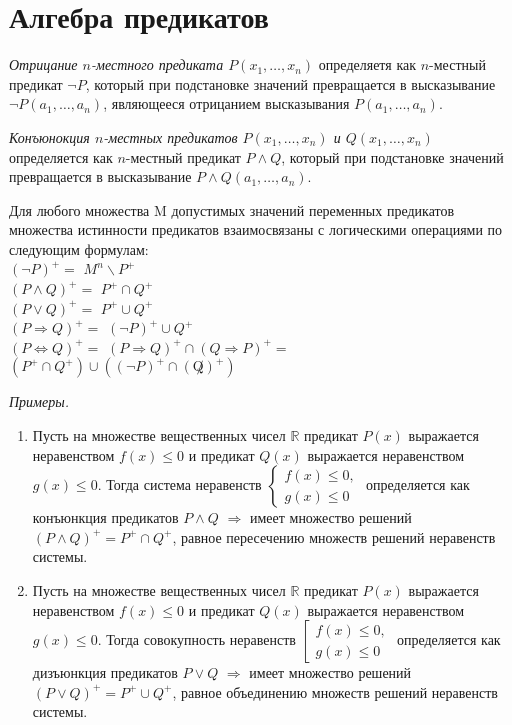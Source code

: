 \section{Алгебра предикатов}

{\it Отрицание $n$-местного предиката $P(x_1, \dots, x_n)$} определяетя как $n$-местный предикат $\neg P$, который при подстановке значений превращается в высказывание $\neg P(a_1, \dots, a_n)$, являющееся отрицанием высказывания $P(a_1, \dots, a_n)$.

{\it Конъюнокция $n$-местных предикатов $P(x_1, \dots, x_n)$ и $Q(x_1, \dots, x_n)$} определяется как $n$-местный предикат $P \land Q$, который при подстановке значений превращается в высказывание $P\land Q(a_1, \dots, a_n)$.

Для любого множества M допустимых значений переменных предикатов множества истинности предикатов взаимосвязаны с логическими операциями по следующим формулам: \\
$(\neg P)^+ =$ $M^n \backslash P^+$ \\
$(P \land Q)^+ =$ $P^+ \cap Q^+$ \\
$(P \lor Q)^+ =$ $P^+ \cup Q^+$ \\
$(P \Rightarrow Q)^+ =$ $(\neg P)^+ \cup Q^+$ \\
$(P \Leftrightarrow Q)^+ =$ $(P \Rightarrow Q)^+ \cap (Q \Rightarrow P)^+ =$ $(P^+ \cap Q^+) \cup ((\neg P)^+ \cap (\not Q)^+)$

{\it Примеры.}
\begin{enumerate}
    \item Пусть на множестве вещественных чисел $\mathbb R$ предикат $P(x)$ выражается неравенством $f(x) \leq 0$ и предикат $Q(x)$ выражается неравенством $g(x) \leq 0$. Тогда система неравенств $\begin{cases} f(x) \leq 0, \\ g(x) \leq 0 \end{cases}$ определяется как конъюнкция предикатов $P \land Q$ $\Rightarrow$ имеет множество решений $(P \land Q)^+ = P^+ \cap Q^+$, равное пересечению множеств решений неравенств системы.
    \item Пусть на множестве вещественных чисел $\mathbb R$ предикат $P(x)$ выражается неравенством $f(x) \leq 0$ и предикат $Q(x)$ выражается неравенством $g(x) \leq 0$. Тогда совокупность неравенств $\left[ \begin{gathered} f(x) \leq 0, \\ g(x) \leq 0 \end{gathered} \right.$ определяется как дизъюнкция предикатов $P \lor Q$ $\Rightarrow$ имеет множество решений $(P \lor Q)^+ = P^+ \cup Q^+$, равное объединению множеств решений неравенств системы.
\end{enumerate}


